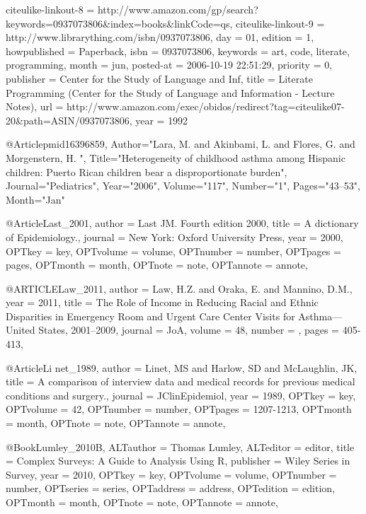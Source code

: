 {{{{    citeulike-linkout-8 = {http://www.amazon.com/gp/search?keywords=0937073806\&index=books\&linkCode=qs},
    citeulike-linkout-9 = {http://www.librarything.com/isbn/0937073806},
    day = {01},
    edition = {1},
    howpublished = {Paperback},
    isbn = {0937073806},
    keywords = {art, code, literate, programming},
    month = jun,
    posted-at = {2006-10-19 22:51:29},
    priority = {0},
    publisher = {Center for the Study of Language and Inf},
    title = {{Literate Programming (Center for the Study of Language and Information - Lecture Notes)}},
    url = {http://www.amazon.com/exec/obidos/redirect?tag=citeulike07-20\&path=ASIN/0937073806},
    year = {1992}
}


@Article{pmid16396859,
   Author="Lara, M.  and Akinbami, L.  and Flores, G.  and Morgenstern, H. ",
   Title="{{H}eterogeneity of childhood asthma among {H}ispanic children: {P}uerto {R}ican children bear a disproportionate burden}",
   Journal="Pediatrics",
   Year="2006",
   Volume="117",
   Number="1",
   Pages="43--53",
   Month="Jan"
}


@Article{Last_2001,
author = {Last JM. Fourth edition 2000},
title = {A dictionary of Epidemiology.},
journal = {New York: Oxford University Press},
year = {2000},
OPTkey = {key},
OPTvolume = {volume},
OPTnumber = {number},
OPTpages = {pages},
OPTmonth = {month},
OPTnote = {note},
OPTannote = {annote},
}

@ARTICLE{Law_2011,
  author = {Law, H.Z. and Oraka, E. and Mannino, D.M.},
  year = {2011},
  title = {The Role of Income in Reducing Racial and Ethnic Disparities in Emergency Room and Urgent Care Center Visits for Asthma—United States, 2001–2009},
  journal = JoA,
  volume =  {48},
  number = {},
  pages = {405-413},
}

@Article{Li
net_1989,
author = {Linet, MS and Harlow, SD and McLaughlin, JK},
title = {A comparison of interview data and medical records for previous medical conditions and surgery.},
journal = {JClinEpidemiol},
year = {1989},
OPTkey = {key},
OPTvolume = {42},
OPTnumber = {number},
OPTpages = {1207-1213},
OPTmonth = {month},
OPTnote = {note},
OPTannote = {annote},
}


@Book{Lumley_2010B,
ALTauthor = {Thomas Lumley},
ALTeditor = {editor},
title = {Complex Surveys: A Guide to Analysis Using R},
publisher = {Wiley Series in Survey},
year = {2010},
OPTkey = {key},
OPTvolume = {volume},
OPTnumber = {number},
OPTseries = {series},
OPTaddress = {address},
OPTedition = {edition},
OPTmonth = {month},
OPTnote = {note},
OPTannote = {annote},
}

}}}
